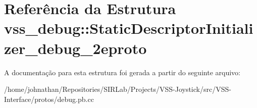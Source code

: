 \hypertarget{structvss__debug_1_1StaticDescriptorInitializer__debug__2eproto}{}\section{Referência da Estrutura vss\+\_\+debug\+:\+:Static\+Descriptor\+Initializer\+\_\+debug\+\_\+2eproto}
\label{structvss__debug_1_1StaticDescriptorInitializer__debug__2eproto}


A documentação para esta estrutura foi gerada a partir do seguinte arquivo\+:\begin{DoxyCompactItemize}
\item 
/home/johnathan/\+Repositories/\+S\+I\+R\+Lab/\+Projects/\+V\+S\+S-\/\+Joystick/src/\+V\+S\+S-\/\+Interface/protos/debug.\+pb.\+cc\end{DoxyCompactItemize}
